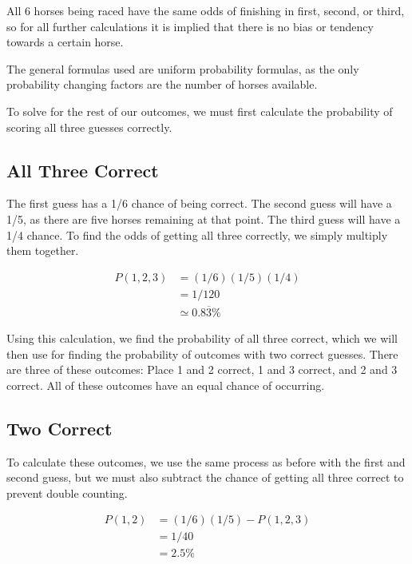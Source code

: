 \documentclass{article}
\begin{document}
{
All 6 horses being raced have the same odds of finishing in first, second, or third, so for all further calculations it is implied that there is no bias or tendency towards a certain horse.

\vspace{2ex}

The general formulas used are uniform probability formulas, as the only probability changing factors are the number of horses available. 

\vspace{2ex}

To solve for the rest of our outcomes, we must first calculate the probability of scoring all three guesses correctly. 

\vspace{2ex}
\subsection{All Three Correct}
{
The first guess has a 1/6 chance of being correct. The second guess will have a 1/5, as there are five horses remaining at that point. The third guess will have a 1/4 chance. To find the odds of getting all three correctly, we simply multiply them together.

\begin{equation}
    \begin{split}
        P(1,2,3) &= (1/6)(1/5)(1/4)\\
        &= 1/120\\
        &\simeq 0.8\overline{3}\%
    \end{split}
\end{equation}
}

Using this calculation, we find the probability of all three correct, which we will then use for finding the probability of outcomes with two correct guesses. There are three of these outcomes: Place 1 and 2 correct, 1 and 3 correct, and 2 and 3 correct. All of these outcomes have an equal chance of occurring.

\vspace{2ex}
\subsection{Two Correct}
{
To calculate these outcomes, we use the same process as before with the first and second guess, but we must also subtract the chance of getting all three correct to prevent double counting.

\begin{equation}
    \begin{split}
        P(1,2) &= (1/6)(1/5) - P(1,2,3)\\
        &= 1/40\\
        &= 2.5\% \\
    \end{split}
\end{equation}
}

}
\end{document}
